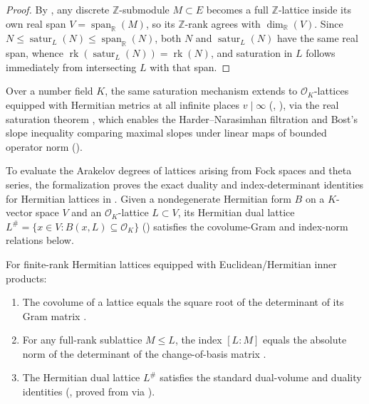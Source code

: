 \begin{proof}
By , any discrete
$\mathbb{Z}$-submodule $M \subset E$ becomes a full $\mathbb{Z}$-lattice inside
its own real span $V = \operatorname{span}_{\mathbb{R}}(M)$, so its
$\mathbb{Z}$-rank agrees with $\dim_{\mathbb{R}}(V)$.
Since $N \le \operatorname{satur}_L(N) \le \operatorname{span}_{\mathbb{R}}(N)$,
both $N$ and $\operatorname{satur}_L(N)$ have the same real span, whence
$\operatorname{rk}(\operatorname{satur}_L(N)) = \operatorname{rk}(N)$, and
saturation in $L$ follows immediately from intersecting $L$ with that span.
\end{proof}

Over a number field $K$, the same saturation mechanism extends to
$\mathcal{O}_K$-lattices equipped with Hermitian metrics at all infinite places
$v \mid \infty$ (, ),
via the real saturation theorem ,
which enables the Harder--Narasimhan filtration and Bost's slope inequality
comparing maximal slopes under linear maps of bounded operator norm
().

To evaluate the Arakelov degrees of lattices arising from Fock spaces and
theta series, the formalization proves the exact duality and index-determinant
identities for Hermitian lattices in .
Given a nondegenerate Hermitian form $B$ on a $K$-vector space $V$ and an
$\mathcal{O}_K$-lattice $L \subset V$, its Hermitian dual lattice
$L^{\#} = \{x \in V : B(x, L) \subseteq \mathcal{O}_K\}$
() satisfies the covolume-Gram and index-norm
relations below.

\begin{proposition}
\label{prop:ch02-fock-gram}
For finite-rank Hermitian lattices equipped with Euclidean/Hermitian inner
products:
\begin{enumerate}
  \item The covolume of a lattice equals the square root of the determinant of
        its Gram matrix .
  \item For any full-rank sublattice $M \le L$, the index $[L : M]$ equals the
        absolute norm of the determinant of the change-of-basis matrix
        .
  \item The Hermitian dual lattice $L^{\#}$ satisfies the standard dual-volume
        and duality identities (, proved from
         via ).
\end{enumerate}
\end{proposition}

